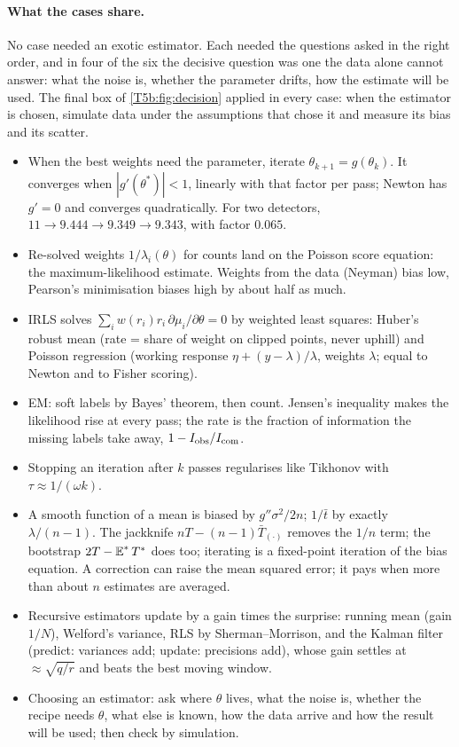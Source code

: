\paragraph{What the cases share.}
No case needed an exotic estimator. Each needed the questions asked in the
right order, and in four of the six the decisive question was one the data
alone cannot answer: what the noise is, whether the parameter drifts, how
the estimate will be used. The final box of \cref{T5b:fig:decision} applied
in every case: when the estimator is chosen, simulate data under the
assumptions that chose it and measure its bias and its scatter.

\begin{recap}
\begin{itemize}[leftmargin=1.2em,itemsep=1pt]
\item When the best weights need the parameter, iterate $\theta_{k+1}=g(\theta_k)$. It
      converges when $|g'(\theta^*)|<1$, linearly with that factor per pass;
      Newton has $g'=0$ and converges quadratically. For two detectors,
      $11\to9.444\to9.349\to9.343$, with factor $0.065$.
\item Re-solved weights $1/\lambda_i(\theta)$ for counts land on the Poisson score
      equation: the maximum-likelihood estimate. Weights from the data
      (Neyman) bias low, Pearson's minimisation biases high by about half as
      much.
\item IRLS solves $\sum_i w(r_i)r_i\,\partial\mu_i/\partial\theta=0$ by weighted least squares:
      Huber's robust mean (rate = share of weight on clipped points, never
      uphill) and Poisson regression (working response $\eta+(y-\lambda)/\lambda$,
      weights $\lambda$; equal to Newton and to Fisher scoring).
\item EM: soft labels by Bayes' theorem, then count. Jensen's inequality
      makes the likelihood rise at every pass; the rate is the fraction of
      information the missing labels take away, $1-I_{\rm obs}/I_{\rm com}$.
\item Stopping an iteration after $k$ passes regularises like Tikhonov with
      $\tau\approx1/(\omega k)$.
\item A smooth function of a mean is biased by $g''\sigma^2/2n$; $1/\bar t$ by
      exactly $\lambda/(n-1)$. The jackknife $nT-(n-1)\bar T_{(\cdot)}$ removes the $1/n$
      term; the bootstrap $2T-\E^*T^*$ does too; iterating is a fixed-point
      iteration of the bias equation. A correction can raise the mean
      squared error; it pays when more than about $n$ estimates are averaged.
\item Recursive estimators update by a gain times the surprise: running
      mean (gain $1/N$), Welford's variance, RLS by Sherman--Morrison, and the
      Kalman filter (predict: variances add; update: precisions add), whose
      gain settles at $\approx\sqrt{q/r}$ and beats the best moving window.
\item Choosing an estimator: ask where $\theta$ lives, what the noise is, whether
      the recipe needs $\theta$, what else is known, how the data arrive and how
      the result will be used; then check by simulation.
\end{itemize}
\end{recap}

